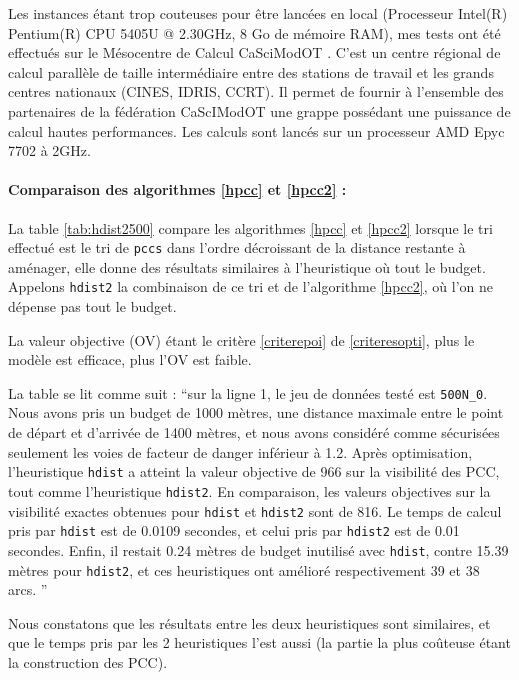 Les instances étant trop couteuses pour être lancées en local (Processeur Intel(R) Pentium(R) CPU 5405U @ 2.30GHz, 8 Go de mémoire RAM), mes tests ont été effectués sur le Mésocentre de Calcul CaSciModOT \cite{cas}. C'est un centre régional de calcul parallèle de taille intermédiaire entre des stations de travail et les grands centres nationaux (CINES, IDRIS, CCRT). Il permet de fournir à l'ensemble des partenaires de la fédération CaScIModOT une grappe possédant une puissance de calcul hautes performances. Les calculs sont lancés sur un processeur AMD Epyc 7702 à 2GHz.

\paragraph{Comparaison des algorithmes \ref{hpcc} et \ref{hpcc2} :}

La table \ref{tab:hdist2500} compare les algorithmes \ref{hpcc} et \ref{hpcc2} lorsque le tri effectué est le tri de \verb|pccs| dans l'ordre décroissant de la distance restante à aménager, elle donne des résultats similaires à l'heuristique où tout le budget. Appelons \verb|hdist2| la combinaison de ce tri et de l'algorithme \ref{hpcc2}, où l'on ne dépense pas tout le budget.

La valeur objective (OV) étant le critère \ref{criterepoi} de \ref{criteresopti}, plus le modèle est efficace, plus l'OV est faible.

La table se lit comme suit : ``sur la ligne 1, le jeu de données testé est \verb|500N_0|. Nous avons pris un budget de 1000 mètres, une distance maximale entre le point de départ et d'arrivée de 1400 mètres, et nous avons considéré comme sécurisées seulement les voies de facteur de danger inférieur à 1.2. Après optimisation, l'heuristique \verb|hdist| a atteint la valeur objective de 966 sur la visibilité des PCC, tout comme l'heuristique \verb|hdist2|. En comparaison, les valeurs objectives sur la visibilité exactes obtenues pour \verb|hdist| et \verb|hdist2| sont de 816. Le temps de calcul pris par \verb|hdist| est de 0.0109 secondes, et celui pris par \verb|hdist2| est de 0.01 secondes. Enfin, il restait 0.24 mètres de budget inutilisé avec \verb|hdist|, contre 15.39 mètres pour \verb|hdist2|, et ces heuristiques ont amélioré respectivement 39 et 38 arcs. ''

Nous constatons que les résultats entre les deux heuristiques sont similaires, et que le temps pris par les 2 heuristiques l'est aussi (la partie la plus coûteuse étant la construction des PCC). 

